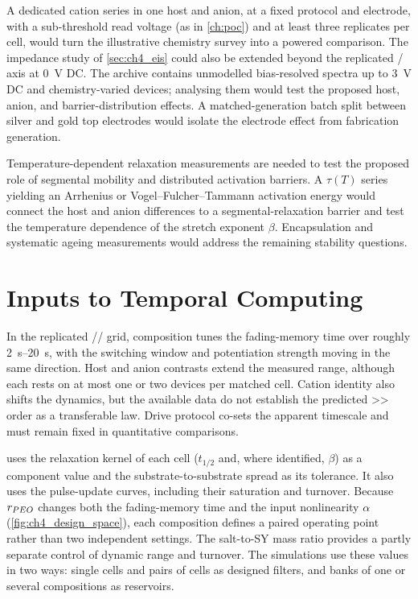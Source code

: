\documentclass[12pt, twoside]{report}
\begin{document}
A dedicated cation series in one host and anion, at a fixed protocol and electrode, with a sub-threshold read voltage (as in \cref{ch:poc}) and at least three replicates per cell, would turn the illustrative chemistry survey into a powered comparison. The impedance study of \cref{sec:ch4_eis} could also be extended beyond the replicated \PEO{}/\LiTf{} axis at \SI{0}{\volt} DC. The archive contains unmodelled bias-resolved spectra up to \SI{3}{\volt} DC and chemistry-varied devices; analysing them would test the proposed host, anion, and barrier-distribution effects. A matched-generation batch split between silver and gold top electrodes would isolate the electrode effect from fabrication generation.

Temperature-dependent relaxation measurements are needed to test the proposed role of segmental mobility and distributed activation barriers. A \(\tau(T)\) series yielding an Arrhenius or Vogel--Fulcher--Tammann activation energy would connect the host and anion differences to a segmental-relaxation barrier and test the temperature dependence of the stretch exponent \(\beta\). Encapsulation and systematic ageing measurements would address the remaining stability questions.

\section{Inputs to Temporal Computing}\label{sec:ch4_bridge}

In the replicated \SY{}/\PEO{}/\LiTf{} grid, composition tunes the fading-memory time over roughly \SIrange{2}{20}{\second}, with the switching window and potentiation strength moving in the same direction. Host and anion contrasts extend the measured range, although each rests on at most one or two devices per matched cell. Cation identity also shifts the dynamics, but the available data do not establish the predicted >> order as a transferable law. Drive protocol co-sets the apparent timescale and must remain fixed in quantitative comparisons.

 uses the relaxation kernel of each cell (\(t_{1/2}\) and, where identified, \(\beta\)) as a component value and the substrate-to-substrate spread as its tolerance. It also uses the pulse-update curves, including their saturation and turnover. Because \(r_{PEO{}}\) changes both the fading-memory time and the input nonlinearity \(\alpha\) (\cref{fig:ch4_design_space}), each composition defines a paired operating point rather than two independent settings. The salt-to-SY mass ratio provides a partly separate control of dynamic range and turnover. The simulations use these values in two ways: single cells and pairs of cells as designed filters, and banks of one or several compositions as reservoirs.
\end{document}
